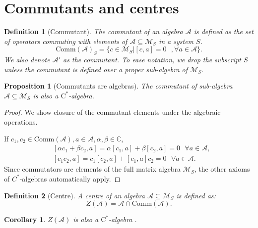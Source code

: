 \documentclass[11pt, twocolumn, floatfix, superscriptaddress, aps, prb, raggedbottom]{revtex4-2}
\newtheorem{corollary}[theorem]{Corollary}
\newtheorem{definition}{Definition}[section]
\newtheorem{proposition}{Proposition}[section]
\newcommand{\comm}{\mathrm{Comm}}
\newcommand{\cstar}{$\mathrm{C}^*$-algebra }
\begin{document}
\section{Commutants and centres \label{app:commutants}}
\begin{definition}[Commutant]
    The commutant of an algebra $\mathcal{A}$ is defined as the set of operators commuting with elements of $\mathcal{A}\subseteq \mathcal{M}_S $ in a system $S$.
    \begin{equation}
        \mathrm{Comm}(\mathcal{A})_S = \{ c \in \mathcal{M}_S |[c, a] = 0 \text{ }, \forall a \in \mathcal{A}\}.
    \end{equation}
    We also denote $\mathcal{A}'$ as the commutant. To ease notation, we drop the subscript $S$ unless the commutant is defined over a proper sub-algebra of $\mathcal{M}_S$.
\end{definition}
\begin{proposition}[Commutants are algebras]
    The commutant of sub-algebra $\mathcal{A} \subseteq \mathcal{M}_S$  is also a $\mathrm{C}^*$-algebra.
\end{proposition}

\begin{proof}
    We show closure of the commutant elements under the algebraic operations. 
    
    If $c_1, c_2 \in \comm(\mathcal{A}), a \in \mathcal{A} , \alpha, \beta \in \mathds{C}$, 
    \begin{align}
        &[\alpha c_1 + \beta c_2, a] = \alpha [c_1, a] + \beta [c_2, a] = 0 \text{ } \forall a \in \mathcal{A}, \\
        & [c_1c_2, a] = c_1[c_2, a] + [c_1, a]c_2 = 0\text{ } \forall a \in \mathcal{A}.
    \end{align}
    Since commutators are elements of the full matrix algebra $\mathcal{M}_S$, the other axioms of $C^*$-algebras automatically apply.
\end{proof}
\begin{definition}[Centre]
    A centre of an algebra $\mathcal{A}\subseteq \mathcal{M}_S$ is defined as:
    \begin{equation}
        Z(\mathcal{A}) = \mathcal{A} \cap \comm(\mathcal{A}).
    \end{equation}
\end{definition}
\begin{corollary}
    $Z(\mathcal{A})$ is also a \cstar.
\end{corollary}
\end{document}
